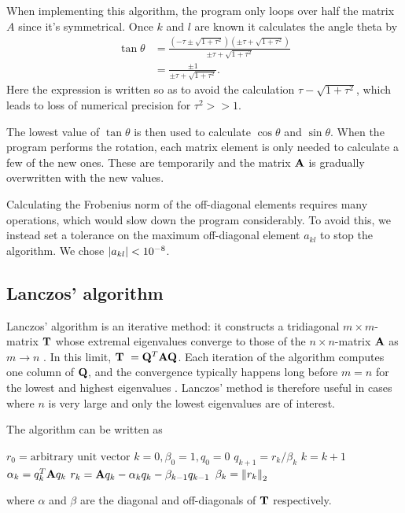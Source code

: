 \documentclass[a4paper,10pt,twocolumn]{article}
\begin{document}

When implementing this algorithm, the program only loops over half the matrix $A$ since it's symmetrical. Once $k$ and $l$ are known it calculates the angle theta by \cite{lecture}
\begin{align*}
\tan\theta &= \frac{(-\tau\pm\sqrt{1+\tau^2})(\pm\tau+\sqrt{1+\tau^2})}{\pm\tau+\sqrt{1+\tau^2}}
\\&= \frac{\pm1}{\pm\tau + \sqrt{1+\tau^2}}.
\end{align*}
Here the expression is written so as to avoid the calculation $\tau - \sqrt{1+\tau^2}$, which leads to loss of numerical precision for $\tau^2>>1$.

The lowest value of $\tan\theta$ is then used to calculate $\cos\theta$ and $\sin\theta$.
When the program performs the rotation, each matrix element is only needed to calculate a few of the new ones. These are temporarily and the matrix $\vb{A}$ is gradually overwritten with the new values. 

Calculating the Frobenius norm of the off-diagonal elements requires many operations, which would slow down the program considerably. To avoid this, we instead set a tolerance on the maximum off-diagonal element $a_{kl}$ to stop the algorithm. We chose $\abs{a_{kl}}<10^{-8}$.


\subsection*{Lanczos' algorithm}
Lanczos' algorithm is an iterative method: it constructs a tridiagonal $m\times m$-matrix $\vb{T}$ whose extremal eigenvalues converge to those of the $n\times n$-matrix $\vb{A}$ as $m\to n$ \cite{matcomp}. In this limit, $\vb{T} = \vb{Q}^T\vb{A}\vb{Q}$. 
Each iteration of the algorithm computes one column of $\vb{Q}$, and the convergence typically happens long before $m=n$ for the lowest and highest eigenvalues \cite{matcomp}.
Lanczos' method is therefore useful in cases where $n$ is very large and only the lowest eigenvalues are of interest. 

The algorithm can be written as \cite{matcomp}
\begin{algorithmic}
\State $r_0 = \text{arbitrary unit vector}$
\State $k=0, \beta_0=1, q_0=0$
\State $q_{k+1} = r_k/\beta_k$
\State $k = k+1$
\State $\alpha_k = q_k^T \vb{A} q_k$
\State $r_k = \vb{A}q_k - \alpha_kq_k - \beta_{k-1}q_{k-1}$
\State $\beta_k = \norm{r_k}_2$
\EndWhile 
\end{algorithmic}
where $\alpha$ and $\beta$ are the diagonal and off-diagonals of $\vb{T}$ respectively. 
\end{document}
